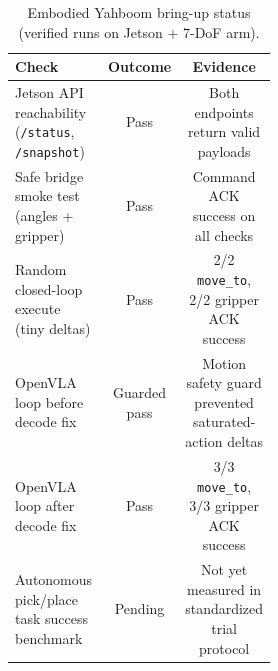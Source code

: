\begin{table}[t]
\centering
\caption{Embodied Yahboom bring-up status (verified runs on Jetson + 7-DoF arm).}
\label{tab:yahboom_bringup_status}
\begin{tabular}{p{0.52\linewidth}cc}
\toprule
Check & Outcome & Evidence \\
\midrule
Jetson API reachability (\texttt{/status}, \texttt{/snapshot}) & Pass & Both endpoints return valid payloads \\
Safe bridge smoke test (angles + gripper) & Pass & Command ACK success on all checks \\
Random closed-loop execute (tiny deltas) & Pass & 2/2 \texttt{move\_to}, 2/2 gripper ACK success \\
OpenVLA loop before decode fix & Guarded pass & Motion safety guard prevented saturated-action deltas \\
OpenVLA loop after decode fix & Pass & 3/3 \texttt{move\_to}, 3/3 gripper ACK success \\
Autonomous pick/place task success benchmark & Pending & Not yet measured in standardized trial protocol \\
\bottomrule
\end{tabular}
\end{table}
